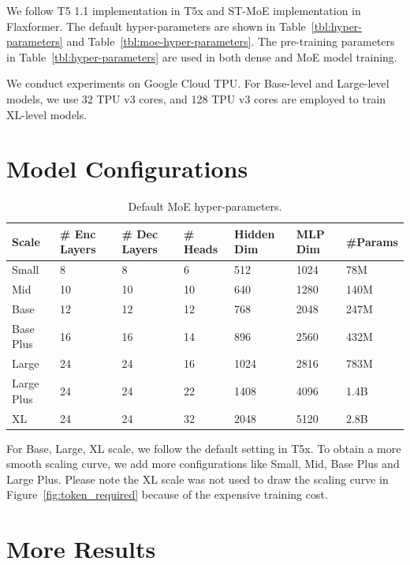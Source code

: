 \documentclass{article}
\begin{document}
We follow T5 1.1 implementation in T5x and ST-MoE implementation in Flaxformer. The default hyper-parameters are shown in Table~\ref{tbl:hyper-parameters} and Table~\ref{tbl:moe-hyper-parameters}. The pre-training parameters in Table~\ref{tbl:hyper-parameters} are used in both dense and MoE model training.


We conduct experiments on Google Cloud TPU. For Base-level and Large-level models, we use 32 TPU v3 cores, and 128 TPU v3 cores are employed to train XL-level models.


\newpage

\section{Model Configurations}\label{sec:detailed-configuration}


\begin{table}[h]
\caption{Default MoE hyper-parameters.}
\vspace{5pt}
\centering
\begin{tabular}{l llllll}
\toprule 
Scale  & \# Enc Layers & \# Dec Layers & \# Heads &  Hidden Dim & MLP Dim & \#Params\\ \midrule
Small   & 8 & 8 & 6 & 512 & 1024 & 78M\\
Mid   & 10 & 10 & 10 & 640 & 1280 & 140M\\
Base   & 12 & 12 & 12 & 768 & 2048 & 247M\\
Base Plus & 16 & 16 & 14 & 896 & 2560 & 432M\\
Large & 24 & 24 & 16 & 1024 & 2816 & 783M\\
Large Plus & 24 & 24 & 22 & 1408 & 4096 & 1.4B \\
XL & 24 & 24 & 32 & 2048 & 5120 & 2.8B \\
\bottomrule
\end{tabular}
\label{tbl:model-configs}
\end{table}

For Base, Large, XL scale, we follow the default setting in T5x. To obtain a more smooth scaling curve, we add more configurations like Small, Mid, Base Plus and Large Plus. Please note the XL scale was not used to draw the scaling curve in Figure~\ref{fig:token_required} because of the expensive training cost.

\newpage

\section{More Results}
\end{document}
